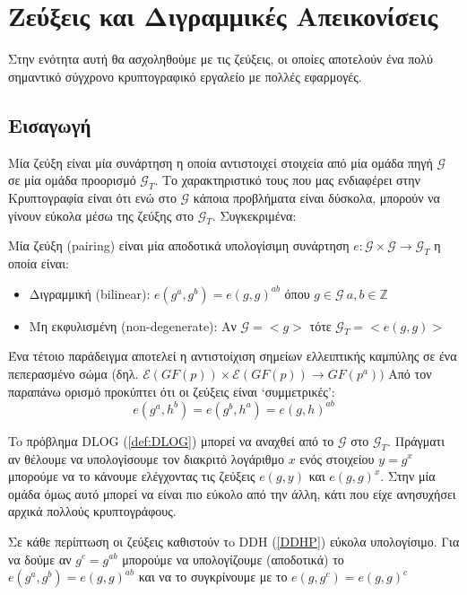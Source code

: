 \section{Ζεύξεις και Διγραμμικές Απεικονίσεις}

Στην ενότητα αυτή θα ασχοληθούμε με τις ζεύξεις, οι οποίες αποτελούν ένα πολύ σημαντικό σύγχρονο κρυπτογραφικό εργαλείο με πολλές εφαρμογές.

\subsection{Εισαγωγή}

Μία ζεύξη είναι μία συνάρτηση η οποία αντιστοιχεί στοιχεία από μία ομάδα πηγή $\mathcal G$ σε μία ομάδα προορισμό $\mathcal G_T$. Το χαρακτηριστικό τους που μας ενδιαφέρει στην Κρυπτογραφία είναι ότι ενώ στο $\mathcal G$ κάποια προβλήματα είναι δύσκολα, μπορούν να γίνουν εύκολα  μέσω της ζεύξης στο $\mathcal G_T$. Συγκεκριμένα:
\begin{definition}
Μία ζεύξη (pairing) είναι μία αποδοτικά υπολογίσιμη συνάρτηση $e : \mathcal G \times \mathcal G \rightarrow \mathcal G_T$ η οποία είναι:
\begin{itemize}
\item Διγραμμική (bilinear): $e(g^a,g^b) = e(g,g)^{ab}$ όπου $g \in \mathcal G \ a,b \in \mathbb{Z}$
\item Μη εκφυλισμένη (non-degenerate): Αν $\mathcal G=<g>$ τότε $\mathcal G_T = <e(g,g)>$
\end{itemize}
\end{definition}

Ένα τέτοιο παράδειγμα αποτελεί η αντιστοίχιση σημείων ελλειπτικής καμπύλης σε ένα πεπερασμένο σώμα (δηλ. $\mathcal E(GF(p)) \times \mathcal E(GF(p)) \rightarrow GF(p^a))$
Από τον παραπάνω ορισμό προκύπτει ότι οι ζεύξεις είναι `συμμετρικές':
\begin{equation}
e(g^a,h^b) = e(g^b,h^a) = e(g,h)^{ab}
\end{equation}

To πρόβλημα \gls{DLOG} (\ref{def:DLOG}) μπορεί να αναχθεί από το $\mathcal G$ στο $\mathcal G_T$. Πράγματι αν θέλουμε να υπολογίσουμε τον διακριτό λογάριθμο $x$ ενός στοιχείου $y=g^x$ μπορούμε να το κάνουμε ελέγχοντας τις ζεύξεις $e(g,y)$ και $e(g,g)^x$. Στην μία ομάδα όμως αυτό μπορεί να είναι πιο εύκολο από την άλλη, κάτι που είχε ανησυχήσει αρχικά πολλούς κρυπτογράφους.

Σε κάθε περίπτωση οι ζεύξεις καθιστούν τo \gls{DDH} (\ref{DDHP}) εύκολα υπολογίσιμο. Για να δούμε αν $g^c = g^{ab}$ μπορούμε να υπολογίζουμε (αποδοτικά) το $e(g^a, g^b) = e(g,g)^{ab}$ και να το συγκρίνουμε με το $e(g,g^c)=e(g,g)^c$

